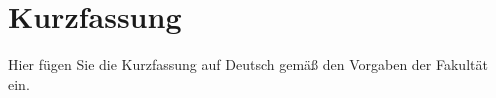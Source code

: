 \chapter*{Kurzfassung}

Hier fügen Sie die Kurzfassung auf Deutsch gemäß den Vorgaben der Fakultät ein.
